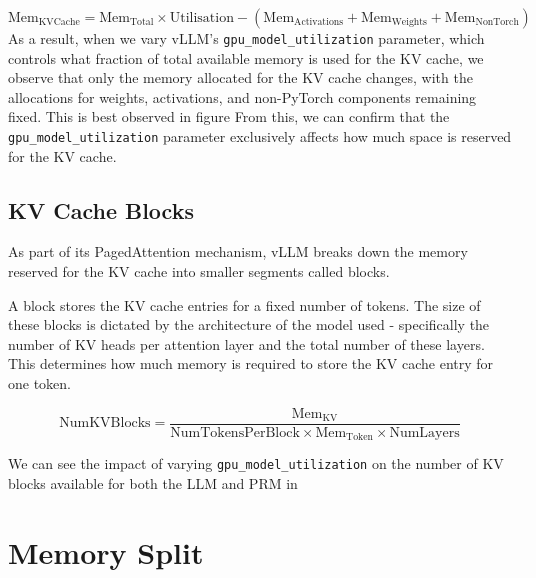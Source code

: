 \documentclass[12pt,twoside]{report}
\begin{document}
\begin{equation*}
  \text{Mem}_{\text{KVCache}} = \text{Mem}_{\text{Total}} \times \text{Utilisation} - (\text{Mem}_{\text{Activations}} + \text{Mem}_{\text{Weights}} + \text{Mem}_{\text{NonTorch}})
\end{equation*}
As a result, when we vary vLLM’s \texttt{gpu\_model\_utilization} parameter, which controls what fraction of total available memory is used for the KV cache, we observe that only the memory allocated for the KV cache changes, with the allocations for weights, activations, and non-PyTorch components remaining fixed.
This is best observed in figure %
From this, we can confirm that the \texttt{gpu\_model\_utilization} parameter exclusively affects how much space is reserved for the KV cache. %


\subsection{KV Cache Blocks}
As part of its PagedAttention mechanism, vLLM breaks down the memory reserved for the KV cache into smaller segments called blocks.

A block stores the KV cache entries for a fixed number of tokens.
The size of these blocks is dictated by the architecture of the model used - specifically the number of KV heads per attention layer and the total number of these layers.
This determines how much memory is required to store the KV cache entry for one token.

\begin{equation*}
  \text{NumKVBlocks} = \frac{\text{Mem}_{\text{KV}}}{\text{NumTokensPerBlock} \times \text{Mem}_{\text{Token}} \times \text{NumLayers}}
\end{equation*}

We can see the impact of varying \texttt{gpu\_model\_utilization} on the number of KV blocks available for both the LLM and PRM in %

\section{Memory Split}

\end{document}
